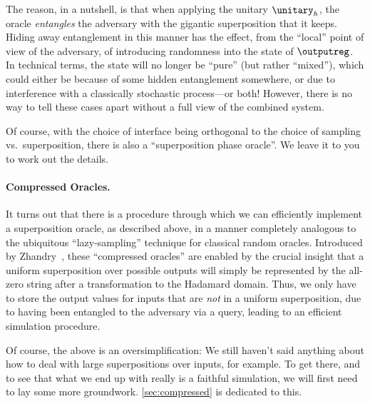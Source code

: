       The reason, in
        a nutshell, is that when applying the unitary $\unitary_h$, the oracle
        \emph{entangles} the adversary with the gigantic superposition that it
        keeps. Hiding away entanglement in this manner has the effect, from the
        ``local'' point of view of the adversary, of introducing randomness
        into the state of $\outputreg$. In technical terms, the state will no
        longer be ``pure'' (but rather ``mixed''), which could
        either be because of some hidden
        entanglement somewhere, or due to interference with a classically stochastic
        process---or both! However, there is no way to tell these cases apart
        without a full view of the combined system.

      Of course, with the choice of interface being orthogonal to the choice of
        sampling vs.\ superposition, there is also a ``superposition phase oracle''.
        We leave it to you to work out the details.

    \paragraph{Compressed Oracles.}
      It turns out that there is a procedure through which we can efficiently
        implement a superposition oracle, as described above, in a manner
        completely analogous to the ubiquitous ``lazy-sampling'' technique for
        classical random oracles. Introduced by Zhandry~\cite{C:Zhandry19},
        these ``compressed oracles'' are enabled by the crucial insight that
        a uniform superposition over possible outputs will simply be
        represented by the all-zero string after a transformation to the
        Hadamard domain. Thus, we only have to store the output values for
        inputs that are \emph{not} in a uniform superposition, due to having
        been entangled to the adversary via a query, leading to an efficient
        simulation procedure.

      Of course, the above is an oversimplification: We still haven't said
        anything about how to deal with large superpositions over inputs, for
        example. To get there, and to see that what we end up with really is a
        faithful simulation, we will first need to lay some more groundwork. 
        \cref{sec:compressed} is dedicated to this.
        
